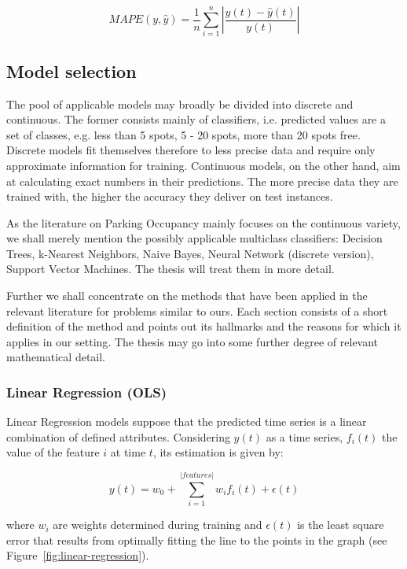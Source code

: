 \documentclass{article}
\begin{document}
$$MAPE(y, \hat{y}) = \frac{1}{n}\sum_{i=1}^{n}|\frac{y(t) - \hat{y}(t)}{y(t)}|$$

\subsection{Model selection}
The pool of applicable models may broadly be divided into discrete and continuous. The former consists mainly of classifiers, i.e. predicted values are a set of classes, e.g. less than 5 spots, 5 - 20 spots, more than 20 spots free. Discrete models fit themselves therefore to less precise data and require only approximate information for training. Continuous models, on the other hand, aim at calculating exact numbers in their predictions. The more precise data they are trained with, the higher the accuracy they deliver on test instances. 

\vspace{2mm}
As the literature on Parking Occupancy mainly focuses on the continuous variety, we shall merely mention the possibly applicable multiclass classifiers: Decision Trees, k-Nearest Neighbors, Naive Bayes, Neural Network (discrete version), Support Vector Machines. The thesis will treat them in more detail.

\vspace{2mm}
Further we shall concentrate on the methods that have been applied in the relevant literature for problems similar to ours. Each section consists of a short definition of the method and points out its hallmarks and the reasons for which it applies in our setting. The thesis may go into some further degree of relevant mathematical detail.

\subsubsection{Linear Regression (OLS)}
Linear Regression models suppose that the predicted time series is a linear combination of defined attributes. Considering $y(t)$ as a time series, $f_i(t)$ the value of the feature $i$ at time $t$, its estimation is given by:

$$y(t) = w_0 + \sum_{i=1}^{|features|}w_i f_i(t) + \epsilon(t)$$

where $w_i$ are weights determined during training and $\epsilon(t)$ is the least square error that results from optimally fitting the line to the points in the graph (see Figure~\ref{fig:linear-regression}).
\end{document}
